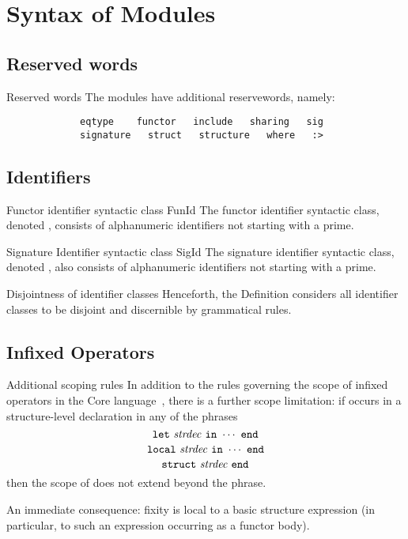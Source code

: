 \chapter{Syntax of Modules}

\section{Reserved words}

\begin{definition}{Reserved words}\label{defn:syntax-modules:reserved-words}
The modules have additional reservewords, namely:
\begin{verbatim}
             eqtype    functor   include   sharing   sig
             signature   struct   structure   where   :>
\end{verbatim}
\end{definition}

\section{Identifiers}

\begin{definition}{Functor identifier syntactic class FunId}
The functor identifier syntactic class, denoted \FunId, consists of
alphanumeric identifiers not starting with a prime.
\end{definition}

\begin{definition}{Signature Identifier syntactic class SigId}
The signature identifier syntactic class, denoted \SigId, also consists
of alphanumeric identifiers not starting with a prime.
\end{definition}

\begin{convention}{Disjointness of identifier classes}
Henceforth, the Definition considers all identifier classes to be
disjoint and discernible by grammatical rules.
\end{convention}

\section{Infixed Operators}

\begin{clause}{Additional scoping rules}
In addition to the rules governing the scope of infixed operators in the
Core language~, there is a
further scope limitation: if  occurs in a
structure-level declaration  in any of the phrases
\[ \texttt{let}\ \nonterminal{strdec}\ \texttt{in}\ \cdots\ \texttt{end} \]
\[ \texttt{local}\ \nonterminal{strdec}\ \texttt{in}\ \cdots\ \texttt{end} \]
\[ \texttt{struct}\ \nonterminal{strdec}\ \texttt{end} \]
then the scope of  does not extend beyond the phrase.

An immediate consequence: fixity is local to a basic structure
expression (in particular, to such an expression occurring as a functor body).
\end{clause}

